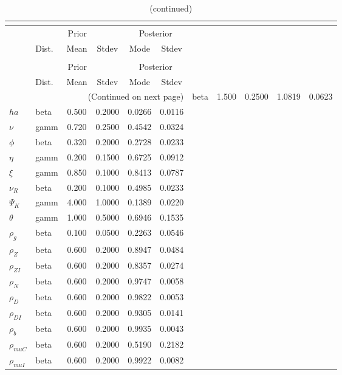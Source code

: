  
\begin{center}
\begin{longtable}{llcccc} 
\caption{Results from posterior maximization (parameters)}\\
 \label{Table:Posterior:1}\\
\toprule 
  & \multicolumn{3}{c}{Prior}  &  \multicolumn{2}{c}{Posterior} \\
  \cmidrule(r{.75em}){2-4} \cmidrule(r{.75em}){5-6}
  & Dist. & Mean  & Stdev & Mode & Stdev \\ 
\midrule \endfirsthead 
\caption{(continued)}\\
 \bottomrule 
  & \multicolumn{3}{c}{Prior}  &  \multicolumn{2}{c}{Posterior} \\
  \cmidrule(r{.75em}){2-4} \cmidrule(r{.75em}){5-6}
  & Dist. & Mean  & Stdev & Mode & Stdev \\ 
\midrule \endhead 
\bottomrule \multicolumn{6}{r}{(Continued on next page)}\endfoot 
\bottomrule\endlastfoot 
${\sigma}$ & beta &   1.500 & 0.2500 &   1.0819 &  0.0623 \\ 
${ha}$ & beta &   0.500 & 0.2000 &   0.0266 &  0.0116 \\ 
$\nu$ & gamm &   0.720 & 0.2500 &   0.4542 &  0.0324 \\ 
${\phi}$ & beta &   0.320 & 0.2000 &   0.2728 &  0.0233 \\ 
${\eta}$ & gamm &   0.200 & 0.1500 &   0.6725 &  0.0912 \\ 
$\xi$ & gamm &   0.850 & 0.1000 &   0.8413 &  0.0787 \\ 
${\nu_R}$ & beta &   0.200 & 0.1000 &   0.4985 &  0.0233 \\ 
${\Psi_{K}}$ & gamm &   4.000 & 1.0000 &   0.1389 &  0.0220 \\ 
${\theta}$ & gamm &   1.000 & 0.5000 &   0.6946 &  0.1535 \\ 
${\rho_g}$ & beta &   0.100 & 0.0500 &   0.2263 &  0.0546 \\ 
${\rho_Z}$ & beta &   0.600 & 0.2000 &   0.8947 &  0.0484 \\ 
${\rho_{ZI}}$ & beta &   0.600 & 0.2000 &   0.8357 &  0.0274 \\ 
${\rho_N}$ & beta &   0.600 & 0.2000 &   0.9747 &  0.0058 \\ 
${\rho_D}$ & beta &   0.600 & 0.2000 &   0.9822 &  0.0053 \\ 
${\rho_{DI}}$ & beta &   0.600 & 0.2000 &   0.9305 &  0.0141 \\ 
${\rho_b}$ & beta &   0.600 & 0.2000 &   0.9935 &  0.0043 \\ 
${\rho_{muC}}$ & beta &   0.600 & 0.2000 &   0.5190 &  0.2182 \\ 
${\rho_{muI}}$ & beta &   0.600 & 0.2000 &   0.9922 &  0.0082 \\ 
\end{longtable}
 \end{center}
